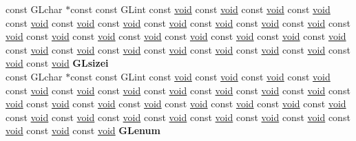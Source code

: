 \begin{DoxyCompactItemize}
\begin{tabbing}
\>const GLchar $\ast$const const GLint const \hyperlink{interfacevoid}{void} const \hyperlink{interfacevoid}{void} const \hyperlink{interfacevoid}{void} const \hyperlink{interfacevoid}{void} const \hyperlink{interfacevoid}{void} const \hyperlink{interfacevoid}{void} const \hyperlink{interfacevoid}{void} const \hyperlink{interfacevoid}{void} const \hyperlink{interfacevoid}{void} const \hyperlink{interfacevoid}{void} const \hyperlink{interfacevoid}{void} const \hyperlink{interfacevoid}{void} const \hyperlink{interfacevoid}{void} const \hyperlink{interfacevoid}{void} const \hyperlink{interfacevoid}{void} const \hyperlink{interfacevoid}{void} const \hyperlink{interfacevoid}{void} const \hyperlink{interfacevoid}{void} const \hyperlink{interfacevoid}{void} const \hyperlink{interfacevoid}{void} const \hyperlink{interfacevoid}{void} const \hyperlink{interfacevoid}{void} const \hyperlink{interfacevoid}{void} const \hyperlink{interfacevoid}{void} const \hyperlink{interfacevoid}{void} const \hyperlink{interfacevoid}{void} const \hyperlink{interfacevoid}{void} const \hyperlink{interfacevoid}{void} {\bfseries GLsizei}\\
\>const GLchar $\ast$const const GLint const \hyperlink{interfacevoid}{void} const \hyperlink{interfacevoid}{void} const \hyperlink{interfacevoid}{void} const \hyperlink{interfacevoid}{void} const \hyperlink{interfacevoid}{void} const \hyperlink{interfacevoid}{void} const \hyperlink{interfacevoid}{void} const \hyperlink{interfacevoid}{void} const \hyperlink{interfacevoid}{void} const \hyperlink{interfacevoid}{void} const \hyperlink{interfacevoid}{void} const \hyperlink{interfacevoid}{void} const \hyperlink{interfacevoid}{void} const \hyperlink{interfacevoid}{void} const \hyperlink{interfacevoid}{void} const \hyperlink{interfacevoid}{void} const \hyperlink{interfacevoid}{void} const \hyperlink{interfacevoid}{void} const \hyperlink{interfacevoid}{void} const \hyperlink{interfacevoid}{void} const \hyperlink{interfacevoid}{void} const \hyperlink{interfacevoid}{void} const \hyperlink{interfacevoid}{void} const \hyperlink{interfacevoid}{void} const \hyperlink{interfacevoid}{void} const \hyperlink{interfacevoid}{void} const \hyperlink{interfacevoid}{void} const \hyperlink{interfacevoid}{void} const \hyperlink{interfacevoid}{void} {\bfseries GLenum}\\

\end{tabbing}
\end{DoxyCompactItemize}
